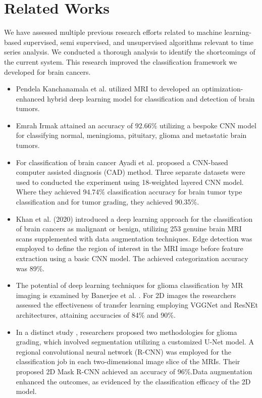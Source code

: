 \section{Related Works}
We have assessed multiple previous research efforts related to machine learning-based supervised, semi supervised, and unsupervised algorithms relevant to time series analysis. We conducted a thorough analysis to identify the shortcomings of the current system. This research improved the classification framework we developed for brain cancers.
\begin{itemize}
\item Pendela Kanchanamala et al. \cite{b9} utilized MRI to developed an optimization-enhanced hybrid deep learning model for classification and detection of brain tumors.

\item Emrah Irmak \cite{b10} attained an accuracy of 92.66\% utilizing a bespoke CNN model for classifying normal, meningioma, pituitary, glioma and metastatic brain tumors.

\item For classification of brain cancer Ayadi et al. \cite{b11} proposed a CNN-based computer assisted diagnosis (CAD) method. Three separate datasets were used to conducted the experiment using 18-weighted layered CNN model. Where they achieved 94.74\% classification accuracy for brain tumor type classification and for tumor grading, they achieved 90.35\%. 

\item Khan et al. \cite{b12} (2020) introduced a deep learning approach for the classification of brain cancers as malignant or benign, utilizing 253 genuine brain MRI scans supplemented with data augmentation techniques. Edge detection was employed to define the region of interest in the MRI image before feature extraction using a basic CNN model. The achieved categorization accuracy was 89\%.

\item The potential of deep learning techniques for glioma classification by MR imaging is examined by Banerjee et al. \cite{b13}. For 2D images the researchers assessed the effectiveness of transfer learning employing VGGNet and ResNEt architectures, attaining accuracies of 84\% and 90\%. 

\item In a distinct study \cite{b14}, researchers proposed two methodologies for glioma grading, which involved segmentation utilizing a customized U-Net model. A regional convolutional neural network (R-CNN) was employed for the classification job in each two-dimensional image slice of the MRIs. Their proposed 2D Mask R-CNN achieved an accuracy of 96\%.Data augmentation enhanced the outcomes, as evidenced by the classification efficacy of the 2D model.


\end{itemize}
